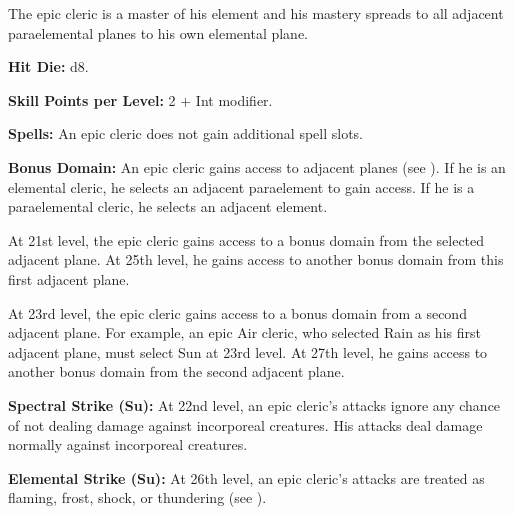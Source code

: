 The epic cleric is a master of his element and his mastery spreads to all adjacent paraelemental planes to his own elemental plane.

\textbf{Hit Die:} d8.

\textbf{Skill Points per Level:} 2 + Int modifier.

\textbf{Spells:} An epic cleric does not gain additional spell slots. %

\textbf{Bonus Domain:} An epic cleric gains access to adjacent planes (see ). If he is an elemental cleric, he selects an adjacent paraelement to gain access. If he is a paraelemental cleric, he selects an adjacent element.

At 21st level, the epic cleric gains access to a bonus domain from the selected adjacent plane. At 25th level, he gains access to another bonus domain from this first adjacent plane.

At 23rd level, the epic cleric gains access to a bonus domain from a second adjacent plane. For example, an epic Air cleric, who selected Rain as his first adjacent plane, must select Sun at 23rd level. At 27th level, he gains access to another bonus domain from the second adjacent plane.


\textbf{Spectral Strike (Su):} At 22nd level, an epic cleric's attacks ignore any chance of not dealing damage against incorporeal creatures. His attacks deal damage normally against incorporeal creatures.

\textbf{Elemental Strike (Su):} At 26th level, an epic cleric's attacks are treated as flaming, frost, shock, or thundering (see ).

